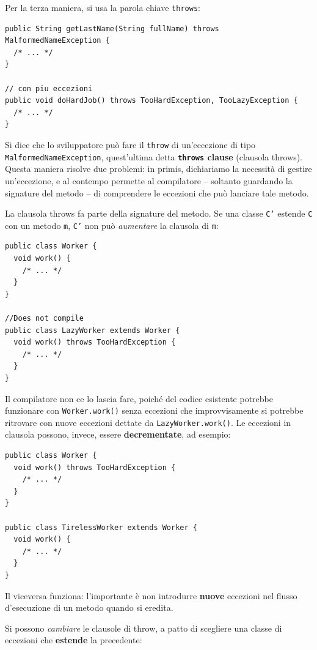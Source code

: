 \documentclass[\fontsizeclass,twocolumn]{\classname}
\theoremstyle{definition}
\theoremstyle{definition}
\begin{document}
Per la terza maniera, si usa la parola chiave \texttt{throws}:

\begin{lstlisting}
public String getLastName(String fullName) throws MalformedNameException {
  /* ... */
}

// con piu eccezioni
public void doHardJob() throws TooHardException, TooLazyException {
  /* ... */
}
\end{lstlisting}

Si dice che lo sviluppatore può fare il \texttt{throw} di un'eccezione di tipo
\texttt{MalformedNameException}, quest'ultima detta \textbf{\texttt{throws}
clause} (clausola throws). Questa maniera risolve due problemi: in primis,
dichiariamo la necessità di gestire un'eccezione, e al contempo permette al
compilatore -- soltanto guardando la signature del metodo -- di comprendere le
eccezioni che può lanciare tale metodo.

La clausola throws fa parte della signature del metodo. Se una classe
\texttt{C'} estende \texttt{C} con un metodo \texttt{m}, \texttt{C'} non può
\emph{aumentare} la clausola di \texttt{m}:

\begin{lstlisting}
public class Worker {
  void work() {
    /* ... */
  }
}

//Does not compile
public class LazyWorker extends Worker {
  void work() throws TooHardException {  
    /* ... */
  }
}
\end{lstlisting}

Il compilatore non ce lo lascia fare, poiché del codice esistente potrebbe
funzionare con \texttt{Worker.work()} senza eccezioni che improvvisamente si
potrebbe ritrovare con nuove eccezioni dettate da \texttt{LazyWorker.work()}.
Le eccezioni in clausola possono, invece, essere \textbf{decrementate}, ad
esempio:

\begin{lstlisting}
public class Worker {
  void work() throws TooHardException {
    /* ... */
  }
}

public class TirelessWorker extends Worker {
  void work() {
    /* ... */
  }
}
\end{lstlisting}

Il viceversa funziona: l'importante è non introdurre \textbf{nuove} eccezioni
nel flusso d'esecuzione di un metodo quando si eredita.

Si possono \emph{cambiare} le clausole di throw, a patto di scegliere una
classe di eccezioni che \textbf{estende} la precedente:
\end{document}
